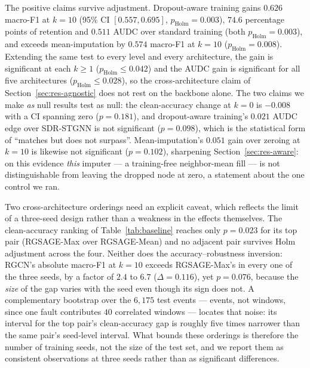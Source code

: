 \documentclass[3p,times,procedia]{elsarticle}
\begin{document}
The positive claims survive adjustment. Dropout-aware training gains $0.626$ macro-F1 at $k=10$ (95\% CI $[0.557, 0.695]$, $p_{\text{Holm}}=0.003$), $74.6$ percentage points of retention and $0.511$ AUDC over standard training (both $p_{\text{Holm}}=0.003$), and exceeds mean-imputation by $0.574$ macro-F1 at $k=10$ ($p_{\text{Holm}}=0.008$). Extending the same test to every level and every architecture, the gain is significant at each $k\ge1$ ($p_{\text{Holm}}\le0.042$) and the AUDC gain is significant for all five architectures ($p_{\text{Holm}}\le0.028$), so the cross-architecture claim of Section~\ref{sec:res-agnostic} does not rest on the backbone alone. The two claims we make \emph{as} null results test as null: the clean-accuracy change at $k=0$ is $-0.008$ with a CI spanning zero ($p=0.181$), and dropout-aware training's $0.021$ AUDC edge over SDR-STGNN is not significant ($p=0.098$), which is the statistical form of ``matches but does not surpass''. Mean-imputation's $0.051$ gain over zeroing at $k=10$ is likewise not significant ($p=0.102$), sharpening Section~\ref{sec:res-aware}: on this evidence \emph{this} imputer --- a training-free neighbor-mean fill --- is not distinguishable from leaving the dropped node at zero, a statement about the one control we ran.

Two cross-architecture orderings need an explicit caveat, which reflects the limit of a three-seed design rather than a weakness in the effects themselves. The clean-accuracy ranking of Table~\ref{tab:baseline} reaches only $p=0.023$ for its top pair (RGSAGE-Max over RGSAGE-Mean) and no adjacent pair survives Holm adjustment across the four. Neither does the accuracy--robustness inversion: RGCN's absolute macro-F1 at $k=10$ exceeds RGSAGE-Max's in every one of the three seeds, by a factor of $2.4$ to $6.7$ ($\Delta=0.116$), yet $p=0.076$, because the \emph{size} of the gap varies with the seed even though its sign does not. A complementary bootstrap over the $6{,}175$ test events --- events, not windows, since one fault contributes $40$ correlated windows --- locates that noise: its interval for the top pair's clean-accuracy gap is roughly five times narrower than the same pair's seed-level interval. What bounds these orderings is therefore the number of training seeds, not the size of the test set, and we report them as consistent observations at three seeds rather than as significant differences.
\end{document}
